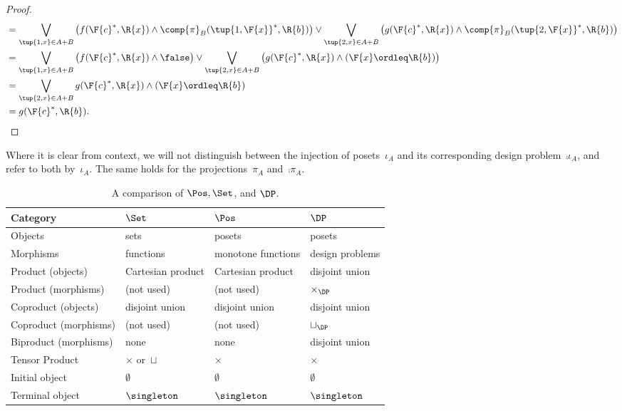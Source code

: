 \begin{proof}
\begin{equation}
\begin{aligned}
      &=\bigvee_{\tup{1,x}\in A+B}\left( f(\F{c}^*,\R{x}) \wedge \comp{\pi}_B(\tup{1,\F{x}}^*,\R{b})\right) \vee
      \bigvee_{\tup{2,x}\in A+B}\left( g(\F{c}^*,\R{x}) \wedge \comp{\pi}_B(\tup{2,\F{x}}^*,\R{b})\right)\\
      &=\bigvee_{\tup{1,x}\in A+B}\left( f(\F{c}^*,\R{x}) \wedge \false \right) \vee
      \bigvee_{\tup{2,x}\in A+B}\left( g(\F{c}^*,\R{x}) \wedge (\F{x}\ordleq \R{b}) \right)\\
      &=\bigvee_{\tup{2,x}\in A+B} g(\F{c}^*,\R{x}) \wedge (\F{x}\ordleq \R{b}) \\
      &=g(\F{c}^*,\R{b}).
    \end{aligned}
  \end{equation}
\end{proof}

\begin{remark}
  Where it is clear from context, we will not distinguish between the injection of posets~$\iota_A$ and its corresponding design problem~$\comp{\iota_A}$, and refer to both by~$\iota_A$. The same holds for the projections~$\pi_A$ and~$\comp{\pi_A}$.
\end{remark}

\begin{table}[b]
  \begin{small}
    \begin{center}
      \begin{tabular}{llll}
        Category              & $\Set$               & $\Pos$             & $\DP$           \\
        \hline
        Objects               & sets                 & posets             & posets          \\
        Morphisms             & functions            & monotone functions & design problems \\
        Product (objects)     & Cartesian product    & Cartesian product  & disjoint union  \\
        Product (morphisms)   & (not used)           & (not used)         & $\times_\DP$    \\
        Coproduct (objects)   & disjoint union       & disjoint union     & disjoint union  \\
        Coproduct (morphisms) & (not used)           & (not used)         & $\sqcup_\DP$    \\
        Biproduct (morphisms) & none                 & none               & disjoint union  \\
        Tensor Product        & $\times$ or~$\sqcup$ & $\times$           & $\times$        \\
        Initial object        & $\emptyset$          & $\emptyset$        & $\emptyset$     \\
        Terminal object       & $\singleton$         & $\singleton$       & $\singleton$
      \end{tabular}
    \end{center}
  \end{small}
  \caption{A comparison of $\Pos, \Set$, and $\DP$.}
\end{table}

